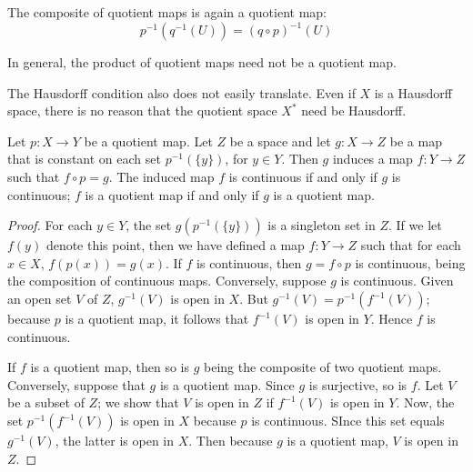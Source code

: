 \documentclass[12pt, a4paper, oneside, openright, titlepage]{book}
\begin{document}
\begin{remark}
    The composite of quotient maps is again a quotient map: \begin{equation*}
        p^{-1}(q^{-1}(U)) = (q\circ p)^{-1}(U)
    \end{equation*}
\end{remark}

In general, the product of quotient maps need not be a quotient map.

\begin{remark}
    The Hausdorff condition also does not easily translate. Even if $X$ is a Hausdorff space, there is no reason that the quotient space $X^*$ need be Hausdorff.
\end{remark}


\begin{theorem}
    Let $p:X\rightarrow Y$ be a quotient map. Let $Z$ be a space and let $g:X\rightarrow Z$ be a map that is constant on each set $p^{-1}(\{y\})$, for $y \in Y$. Then $g$ induces a map $f:Y\rightarrow Z$ such that $f\circ p = g$. The induced map $f$ is continuous if and only if $g$ is continuous; $f$ is a quotient map if and only if $g$ is a quotient map.
    \begin{center}
    \end{center}
\end{theorem}
\begin{proof}
    For each $y \in Y$, the set $g(p^{-1}(\{y\}))$ is a singleton set in $Z$. If we let $f(y)$ denote this point, then we have defined a map $f:Y\rightarrow Z$ such that for each $x \in X$, $f(p(x)) = g(x)$. If $f$ is continuous, then $g = f\circ p$ is continuous, being the composition of continuous maps. Conversely, suppose $g$ is continuous. Given an open set $V$ of $Z$, $g^{-1}(V)$ is open in $X$. But $g^{-1}(V) = p^{-1}(f^{-1}(V))$; because $p$ is a quotient map, it follows that $f^{-1}(V)$ is open in $Y$. Hence $f$ is continuous.

    If $f$ is a quotient map, then so is $g$ being the composite of two quotient maps. Conversely, suppose that $g$ is a quotient map. Since $g$ is surjective, so is $f$. Let $V$ be a subset of $Z$; we show that $V$ is open in $Z$ if $f^{-1}(V)$ is open in $Y$. Now, the set $p^{-1}(f^{-1}(V))$ is open in $X$ because $p$ is continuous. SInce this set equals $g^{-1}(V)$, the latter is open in $X$. Then because $g$ is a quotient map, $V$ is open in $Z$.
\end{proof}
\end{document}
